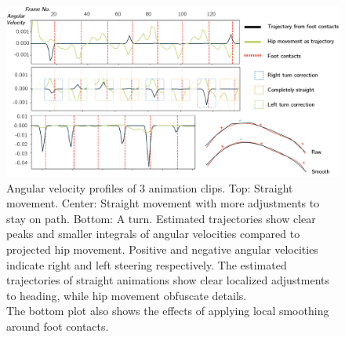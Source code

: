 \begin{figure}
    \centering
    \includegraphics[width=1.0\columnwidth]{img/estimated_trajectory_angular_velocity.png}
    \caption{Angular velocity profiles of 3 animation clips. Top: Straight movement. Center: Straight movement with more adjustments to stay on path. Bottom: A turn. Estimated trajectories show clear peaks and smaller integrals of angular velocities compared to projected hip movement. Positive and negative angular velocities indicate right and left steering respectively. The estimated trajectories of straight animations show clear localized adjustments to heading, while hip movement obfuscate details.\\The bottom plot also shows the effects of applying local smoothing around foot contacts.}
    \label{fig:results:estimatedtrajectory:stats}
\end{figure}


